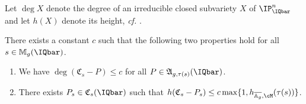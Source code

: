 Let $\deg X$ denote the degree of an irreducible closed subvariety $X$ of
$\IP^n_\IQbar$ and let $h(X)$ denote its height, \textit{cf.} \cite{BGS}.

\begin{lemma}
\notready
  \label{lem:uniformdegreebound}
  There exists a constant $c$ such that the following two properties
  hold for all $s\in \mathbb{M}_g(\IQbar)$.
  \begin{enumerate}
  \item [(i)] We have
    $\deg(\mathfrak{C}_s-P) \le c$
    for all $P\in
    \mathfrak{A}_{g,\tau(s)}(\IQbar)$.
  \item[(ii)]
    There exists $P_s\in \mathfrak{C}_s(\IQbar)$ such that
    $h(\mathfrak{C}_s-P_s) \le  c \max\{1,
    h_{\overline{\mathbb{A}_g},\cM}(\tau(s))\}$.
  \end{enumerate}
\end{lemma}
